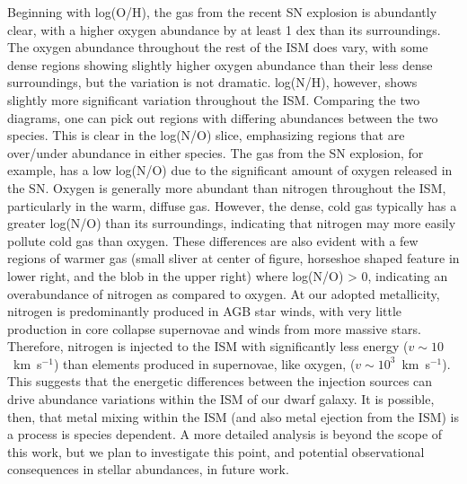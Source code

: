 \documentclass[twocolumn]{aastex61}
\begin{document}
Beginning with log(O/H), the gas from the recent SN explosion is abundantly clear, with a higher oxygen abundance by at least 1 dex than its surroundings. The oxygen abundance throughout the rest of the ISM does vary, with some dense regions showing slightly higher oxygen abundance than their less dense surroundings, but the variation is not dramatic. log(N/H), however, shows slightly more significant variation throughout the ISM. Comparing the two diagrams, one can pick out regions with differing abundances between the two species. This is clear in the log(N/O) slice, emphasizing regions that are over/under abundance in either species. The gas from the SN explosion, for example, has a low log(N/O) due to the significant amount of oxygen released in the SN. Oxygen is generally more abundant than nitrogen throughout the ISM, particularly in the warm, diffuse gas. However, the dense, cold gas typically has a greater log(N/O) than its surroundings, indicating that nitrogen may more easily pollute cold gas than oxygen. These differences are also evident with a few regions of warmer gas (small sliver at center of figure, horseshoe shaped feature in lower right, and the blob in the upper right) where log(N/O) > 0, indicating an overabundance of nitrogen as compared to oxygen. At our adopted metallicity, nitrogen is predominantly produced in AGB star winds, with very little production in core collapse supernovae and winds from more massive stars. Therefore, nitrogen is injected to the ISM with significantly less energy ($v \sim 10$~km~s$^{-1}$) than elements produced in supernovae, like oxygen, ($v\sim 10^3$~km~s$^{-1}$). This suggests that the energetic differences between the injection sources can drive abundance variations within the ISM of our dwarf galaxy. It is possible, then, that metal mixing within the ISM (and also metal ejection from the ISM) is a process is species dependent. A more detailed analysis is beyond the scope of this work, but we plan to investigate this point, and potential observational consequences in stellar abundances, in future work. 

\end{document}
